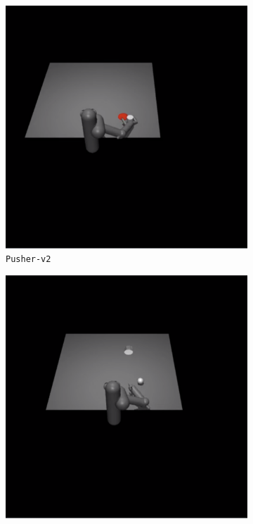 \begin{figure}[h]
\centering
\begin{subfigure}[t]{0.3\textwidth}
    \includegraphics[width=\textwidth]{figures/dyne/Pusher.png}
    \caption{\texttt{Pusher-v2}}
\end{subfigure}
\begin{subfigure}[t]{0.3\textwidth}
    \includegraphics[width=\textwidth]{figures/dyne/Striker.png}

\end{subfigure}
\end{figure}
